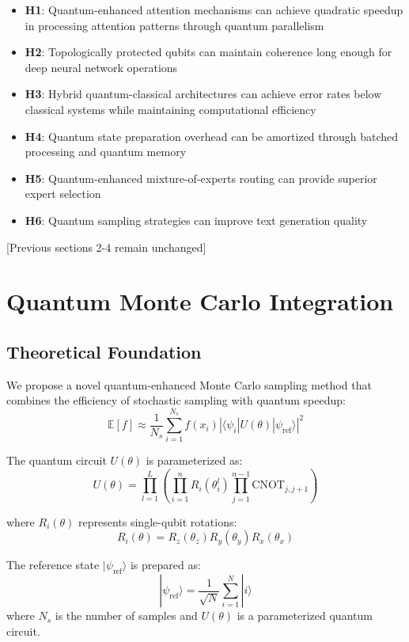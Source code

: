 \documentclass{article}
\begin{document}
\begin{itemize}
\item \textbf{H1}: Quantum-enhanced attention mechanisms can achieve quadratic speedup in processing attention patterns through quantum parallelism
\item \textbf{H2}: Topologically protected qubits can maintain coherence long enough for deep neural network operations
\item \textbf{H3}: Hybrid quantum-classical architectures can achieve error rates below classical systems while maintaining computational efficiency
\item \textbf{H4}: Quantum state preparation overhead can be amortized through batched processing and quantum memory
\item \textbf{H5}: Quantum-enhanced mixture-of-experts routing can provide superior expert selection
\item \textbf{H6}: Quantum sampling strategies can improve text generation quality
\end{itemize}

[Previous sections 2-4 remain unchanged]

\section{Quantum Monte Carlo Integration}
\subsection{Theoretical Foundation}
We propose a novel quantum-enhanced Monte Carlo sampling method that combines the efficiency of stochastic sampling with quantum speedup:
\begin{equation}
\mathbb{E}[f] \approx \frac{1}{N_s} \sum_{i=1}^{N_s} f(x_i) |\langle \psi_i|U(\theta)|\psi_{\text{ref}}\rangle|^2
\end{equation}

The quantum circuit $U(\theta)$ is parameterized as:
\begin{equation}
U(\theta) = \prod_{l=1}^L \left(\prod_{i=1}^n R_i(\theta_i^l) \prod_{j=1}^{n-1} \text{CNOT}_{j,j+1}\right)
\end{equation}

where $R_i(\theta)$ represents single-qubit rotations:
\begin{equation}
R_i(\theta) = R_z(\theta_z)R_y(\theta_y)R_x(\theta_x)
\end{equation}

The reference state $|\psi_{\text{ref}}\rangle$ is prepared as:
\begin{equation}
|\psi_{\text{ref}}\rangle = \frac{1}{\sqrt{N}} \sum_{i=1}^N |i\rangle
\end{equation}
where $N_s$ is the number of samples and $U(\theta)$ is a parameterized quantum circuit.
\end{document}
